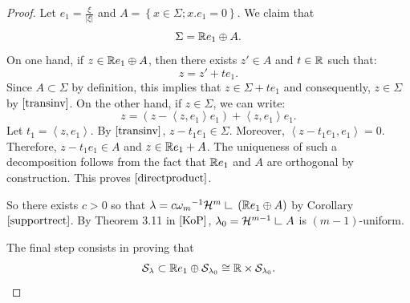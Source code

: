 \documentclass[11pt]{article}
\theoremstyle{definition}
\theoremstyle{remark}
\numberwithin{equation}{section}
\newcommand{\res}{\hbox{{\vrule height .22cm}{\leaders\hrule\hskip .2cm}}}
\def\res{\hbox{ {\vrule height .22cm}{\leaders\hrule\hskip.2cm} } }
\begin{document}
\begin{proof}
Let $e_1 = \frac{\xi}{|\xi|}$ and $A= \left\lbrace x \in \Sigma ; x.{e_1}=0 \right\rbrace $.  
We claim that 
\begin{equation}\label{directproduct} \Sigma= \mathbb{R} e_1 \oplus A.  
\end{equation}
On one hand, if $z \in \mathbb{R} e_1 \oplus A$, then there exists $z' \in A$ and $t \in \mathbb{R}$ such that:
$$z= z' + te_1.$$
Since $A\subset \Sigma$ by definition, this implies that $z \in \Sigma+ te_1$ and consequently, $z \in \Sigma$ by $\eqref{transinv}$.
On the other hand, if $z \in \Sigma$, we can write:
$$ z= (z - \left\langle z,e_1 \right\rangle e_1)+\left\langle z,e_1 \right\rangle e_1.$$
Let $t_1 =  \left\langle z,e_1 \right\rangle$. By $\eqref{transinv}$, $z-t_1e_1 \in \Sigma$. Moreover, $\left\langle z-t_1e_1 , e_1 \right\rangle =0$. Therefore, $z-t_1e_1\in A$ and $z \in \mathbb{R} e_1 + A$.
The uniqueness of such a decomposition follows from the fact that $\mathbb{R} e_1$ and $A$ are orthogonal by construction.
This proves $\eqref{directproduct}$.

So there exists $c>0$ so that $\lambda = c {\omega_{m}}^{-1} \mathcal{H}^{m} \res \left( \RR e_1 \oplus A \right)$ by Corollary $\ref{supportrect}$.
By Theorem 3.11 in $\cite{KoP}$, $\lambda_{0}= \mathcal{H}^{m-1} \res A$ is $(m-1)$-uniform.

The final step consists in proving that \begin{equation}\label{almostproduct}\mathcal{S}_{\lambda} \subset \mathbb{R} e_1 \oplus \mathcal{S}_{\lambda_{0}} \cong \mathbb{R} \times  \mathcal{S}_{\lambda_{0}}.
\end{equation}



\end{proof}
\end{document}
